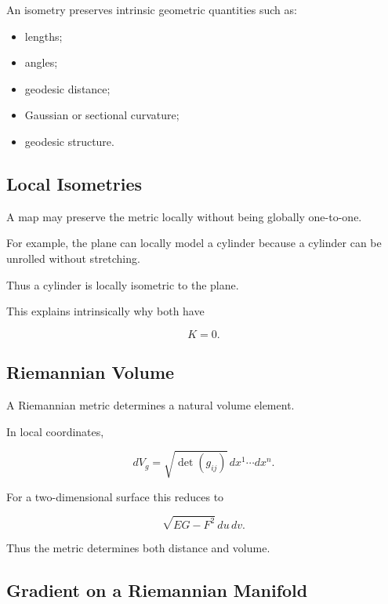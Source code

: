 An isometry preserves intrinsic geometric quantities such as:

\begin{itemize}
    \item lengths;
    \item angles;
    \item geodesic distance;
    \item Gaussian or sectional curvature;
    \item geodesic structure.
\end{itemize}

\subsection{Local Isometries}
\label{subsec:local-isometries}

A map may preserve the metric locally without being globally one-to-one.

For example, the plane can locally model a cylinder because a cylinder can
be unrolled without stretching.

Thus a cylinder is locally isometric to the plane.

This explains intrinsically why both have

\[
K=0.
\]

\subsection{Riemannian Volume}
\label{subsec:riemannian-volume}

A Riemannian metric determines a natural volume element.

In local coordinates,

\[
\boxed{
dV_g
=
\sqrt{\det(g_{ij})}\,
dx^1\cdots dx^n.
}
\]

For a two-dimensional surface this reduces to

\[
\sqrt{EG-F^2}\,du\,dv.
\]

Thus the metric determines both distance and volume.

\subsection{Gradient on a Riemannian Manifold}
\label{subsec:riemannian-gradient}

